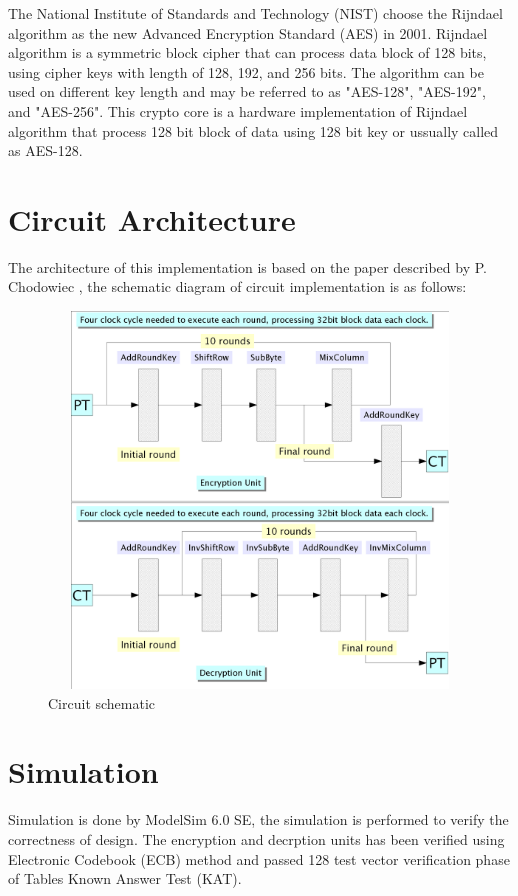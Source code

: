 \documentclass[a4paper,12pt]{report}
\begin{document}
The National Institute of Standards and Technology (NIST) choose the
Rijndael algorithm as the new Advanced Encryption Standard (AES) in
2001. Rijndael algorithm is a symmetric block cipher that can process
data block of 128 bits, using cipher keys with length of 128, 192, and
256 bits. The algorithm can be used on different key length and may be
referred to as "AES-128", "AES-192", and "AES-256". This crypto core is
a hardware implementation of Rijndael algorithm that process 128 bit
block of data using 128 bit key or ussually called as AES-128.

\section{Circuit Architecture}

The architecture of this implementation is based on the paper described
by P.  Chodowiec \cite{chodowiec}, the schematic diagram of circuit
implementation is as follows:

\begin{figure}[H]
\center
\includegraphics[width=15cm,height=10cm]{circuit_schematic.eps}
\caption{Circuit schematic}
\label{circuit_schematic}
\end{figure}

\section{Simulation}

Simulation is done by ModelSim 6.0 SE, the simulation is performed to
verify the correctness of design. The encryption and decrption units has
been verified using Electronic Codebook (ECB) method and passed 128 test
vector verification phase of Tables Known Answer Test (KAT).
\end{document}
